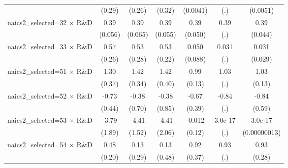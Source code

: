 {\begin{tabular}{l*{6}{c}}
                    &      (0.29)         &      (0.26)         &      (0.32)         &    (0.0041)         &         (.)         &    (0.0051)         \\
\addlinespace
naics2\_selected=32 $\times$ R\&D&        0.39\sym{***}&        0.39\sym{***}&        0.39\sym{***}&        0.39\sym{***}&        0.39         &        0.39\sym{***}\\
                    &     (0.056)         &     (0.065)         &     (0.055)         &     (0.050)         &         (.)         &     (0.044)         \\
\addlinespace
naics2\_selected=33 $\times$ R\&D&        0.57\sym{**} &        0.53\sym{*}  &        0.53\sym{**} &       0.050         &       0.031         &       0.031         \\
                    &      (0.26)         &      (0.28)         &      (0.22)         &     (0.088)         &         (.)         &     (0.029)         \\
\addlinespace
naics2\_selected=51 $\times$ R\&D&        1.30\sym{***}&        1.42\sym{***}&        1.42\sym{***}&        0.99\sym{***}&        1.03         &        1.03\sym{***}\\
                    &      (0.37)         &      (0.34)         &      (0.40)         &      (0.13)         &         (.)         &      (0.13)         \\
\addlinespace
naics2\_selected=52 $\times$ R\&D&       -0.73\sym{*}  &       -0.38         &       -0.38         &       -0.67\sym{*}  &       -0.84         &       -0.84         \\
                    &      (0.44)         &      (0.70)         &      (0.85)         &      (0.39)         &         (.)         &      (0.59)         \\
\addlinespace
naics2\_selected=53 $\times$ R\&D&       -3.79\sym{**} &       -4.41\sym{***}&       -4.41\sym{**} &      -0.012         &     3.0e-17         &     3.0e-17         \\
                    &      (1.89)         &      (1.52)         &      (2.06)         &      (0.12)         &         (.)         &(0.00000013)         \\
\addlinespace
naics2\_selected=54 $\times$ R\&D&        0.48\sym{**} &        0.13         &        0.13         &        0.92\sym{**} &        0.93         &        0.93\sym{***}\\
                    &      (0.20)         &      (0.29)         &      (0.48)         &      (0.37)         &         (.)         &      (0.28)         \\

\end{tabular}}
